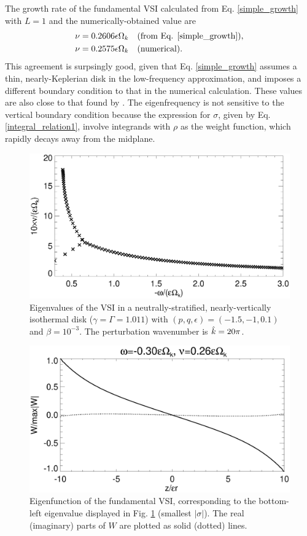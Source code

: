 The growth rate of the fundamental VSI calculated from
Eq. \ref{simple_growth} with $L=1$ and the numerically-obtained value
are  
\begin{align*}
  \nu = 0.2606\epsilon\Omega_k &\quad \text{(from
    Eq. \ref{simple_growth})},\\
  \nu = 0.2575 \epsilon \Omega_k &\quad \text{(numerical)}.
\end{align*}
This agreement is surpsingly good, given that
Eq. \ref{simple_growth} assumes a thin, nearly-Keplerian disk in the 
low-frequency approximation, and 
imposes a different boundary condition to that in the numerical
calculation. These values are also close to that found by
\cite{mcnally14}. The eigenfrequency is not sensitive to the
vertical boundary condition because the expression for $\sigma$, given
by Eq. \ref{integral_relation1}, involve integrands with $\rho$ as the  
weight function, which rapidly decays away from the midplane.

\begin{figure}
  \includegraphics[width=\linewidth]{figures/eigenvalues_iso}
  \caption{Eigenvalues of the VSI in a neutrally-stratified,
    nearly-vertically isothermal disk  ($\gamma=\Gamma=1.011$) with 
    $(p,q,\epsilon)=(-1.5,-1,0.1)$ and $\beta=10^{-3}$. The
    perturbation wavenumber is $\hat{k}=20\pi$. \label{lowfreq_eigen} 
  }
\end{figure}

\begin{figure}
  \includegraphics[width=\linewidth]{figures/eigenvector_iso}
  \caption{Eigenfunction of the fundamental VSI,
    corresponding to the bottom-left eigenvalue displayed in
    Fig. \ref{lowfreq_eigen} (smallest $|\sigma|$). The real
    (imaginary) parts of $W$ are plotted as solid (dotted) lines. 
    \label{lowfreq_eigenfunc}
  }
\end{figure}


